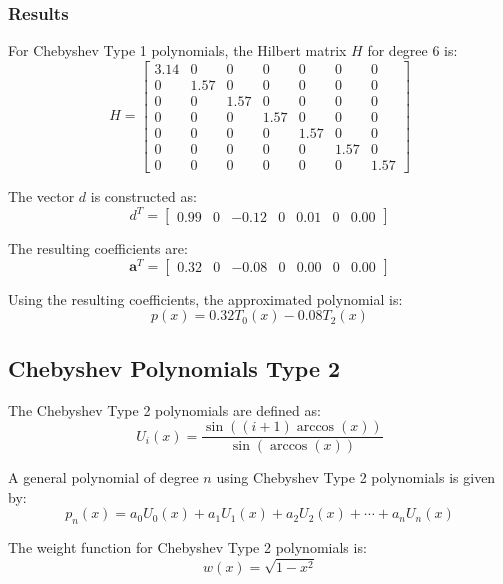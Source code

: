 \documentclass[10pt]{article}
\begin{document}
\subsubsection{Results}

For Chebyshev Type 1 polynomials, the Hilbert matrix \( H \) for degree 6 is:
\[
H = \begin{bmatrix}
3.14 & 0 & 0 & 0 & 0 & 0 & 0 \\
0 & 1.57 & 0 & 0 & 0 & 0 & 0 \\
0 & 0 & 1.57 & 0 & 0 & 0 & 0 \\
0 & 0 & 0 & 1.57 & 0 & 0 & 0 \\
0 & 0 & 0 & 0 & 1.57 & 0 & 0 \\
0 & 0 & 0 & 0 & 0 & 1.57 & 0 \\
0 & 0 & 0 & 0 & 0 & 0 & 1.57
\end{bmatrix}
\]

The vector \( d \) is constructed as:
\[
d^T = \begin{bmatrix}
0.99 & 0 & -0.12 & 0 & 0.01 & 0 & 0.00
\end{bmatrix}
\]

The resulting coefficients are:
\[
\mathbf{a}^T = \begin{bmatrix}
0.32 & 0 & -0.08 & 0 & 0.00 & 0 & 0.00
\end{bmatrix}
\]

Using the resulting coefficients, the approximated polynomial is:
\begin{equation}
p(x) = 0.32 T_0(x) - 0.08 T_2(x)
\end{equation}

\subsection{Chebyshev Polynomials Type 2}
The Chebyshev Type 2 polynomials are defined as:
\begin{equation}
U_i(x) = \frac{\sin((i+1) \arccos(x))}{\sin(\arccos(x))}
\end{equation}

A general polynomial of degree $ n $ using Chebyshev Type 2 polynomials is given by:
\begin{equation}
p_n(x) = a_0 U_0(x) + a_1 U_1(x) + a_2 U_2(x) + \cdots + a_n U_n(x)
\end{equation}

The weight function for Chebyshev Type 2 polynomials is:
\begin{equation}
w(x) = \sqrt{1-x^2}
\end{equation}
\end{document}
